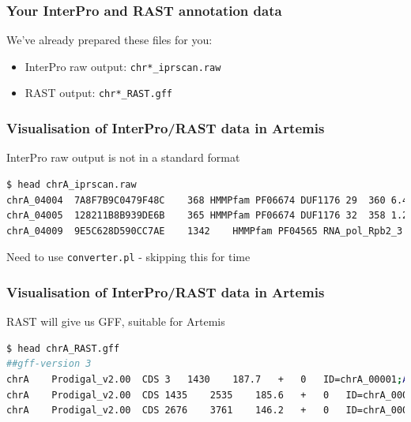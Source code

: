     \begin{frame}
      \frametitle{Your InterPro and RAST annotation data}
      We've already prepared these files for you:
      \begin{itemize}
        \item InterPro raw output: \texttt{chr*\_iprscan.raw}
        \item RAST output: \texttt{chr*\_RAST.gff}
      \end{itemize}
    \end{frame}

  \begin{frame}[fragile]
    \frametitle{Visualisation of InterPro/RAST data in Artemis}
    InterPro raw output is not in a standard format
\begin{lstlisting}[language=bash]
$ head chrA_iprscan.raw 
chrA_04004	7A8F7B9C0479F48C	368	HMMPfam	PF06674	DUF1176	29	360	6.499999999999917E-49	T	23-Mar-2012	IPR009560	Protein of unknown function DUF1176	
chrA_04005	128211B8B939DE6B	365	HMMPfam	PF06674	DUF1176	32	358	1.2000000000000004E-61	T	23-Mar-2012	IPR009560	Protein of unknown function DUF1176	
chrA_04009	9E5C628D590CC7AE	1342	HMMPfam	PF04565	RNA_pol_Rpb2_3	513	582	1.4999999999999956E-29	T	23-Mar-2012	IPR007645	RNA polymerase Rpb2, domain 3	Molecular Function: DNA binding (GO:0003677), Molecular Function: DNA-directed RNA polymerase activity (GO:0003899), Biological Process: transcription, DNA-dependent (GO:0006351)
\end{lstlisting}
    Need to use \texttt{converter.pl} - skipping this for time
\end{frame}

  \begin{frame}[fragile]
    \frametitle{Visualisation of InterPro/RAST data in Artemis}
    RAST will give us GFF, suitable for Artemis
\begin{lstlisting}[language=bash]
$ head chrA_RAST.gff
##gff-version 3
chrA	Prodigal_v2.00	CDS	3	1430	187.7	+	0	ID=chrA_00001;Alias=fig|556.22.peg.1;Name=Chromosomal replication initiator protein DnaA
chrA	Prodigal_v2.00	CDS	1435	2535	185.6	+	0	ID=chrA_00002;Alias=fig|556.22.peg.2;Name=DNA polymerase III beta subunit (EC 2.7.7.7);Ontology_term=KEGG_ENZYME:2.7.7.7
chrA	Prodigal_v2.00	CDS	2676	3761	146.2	+	0	ID=chrA_00003;Alias=fig|556.22.peg.3;Name=DNA recombination and repair protein RecF
\end{lstlisting}
\end{frame}

